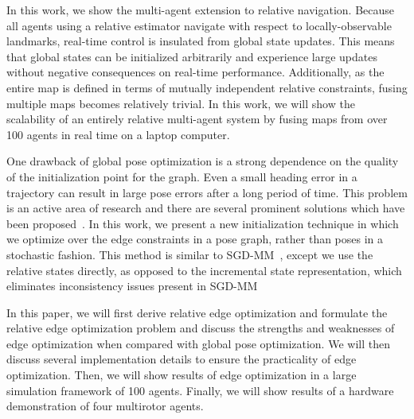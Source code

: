 In this work, we show the multi-agent extension to relative navigation.  Because all agents using a relative estimator navigate with respect to locally-observable landmarks, real-time control is insulated from global state updates.  This means that global states can be initialized arbitrarily and experience large updates without negative consequences on real-time performance. Additionally, as the entire map is defined in terms of mutually independent relative constraints, fusing multiple maps becomes relatively trivial.  In this work, we will show the scalability of an entirely relative multi-agent system by fusing maps from over 100 agents in real time on a laptop computer.

One drawback of global pose optimization is a strong dependence on the quality of the initialization point for the graph.  Even a small heading error in a trajectory can result in large pose errors after a long period of time.  This problem is an active area of research and there are several prominent solutions which have been proposed~\cite{Carlone2015, Kim2010a, Agarwal2014, Wang2014}.  In this work, we present a new initialization technique in which we optimize over the edge constraints in a pose graph, rather than poses in a stochastic fashion. This method is similar to SGD-MM~\cite{Wang2014}, except we use the relative states directly, as opposed to the incremental state representation, which eliminates inconsistency issues present in SGD-MM~\cite{PAPER}

In this paper, we will first derive relative edge optimization and formulate the relative edge optimization problem and discuss the strengths and weaknesses of edge optimization when compared with global pose optimization.  We will then discuss several implementation details to ensure the practicality of edge optimization. Then, we will show results of edge optimization in a large simulation framework of 100 agents.  Finally, we will show results of a hardware demonstration of four multirotor agents.
